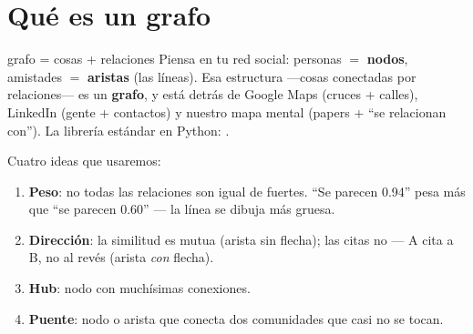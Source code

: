 \documentclass[11pt,a4paper]{article}
\begin{document}

\section{Qué es un grafo}

\begin{concepto}{grafo = cosas + relaciones}
Piensa en tu red social: personas $=$ \textbf{nodos}, amistades $=$ \textbf{aristas} (las
líneas). Esa estructura —cosas conectadas por relaciones— es un \textbf{grafo}, y está detrás
de Google Maps (cruces + calles), LinkedIn (gente + contactos) y nuestro mapa mental
(papers + ``se relacionan con''). La librería estándar en Python: .
\end{concepto}

Cuatro ideas que usaremos:
\begin{enumerate}
  \item \textbf{Peso}: no todas las relaciones son igual de fuertes. ``Se parecen 0.94'' pesa
        más que ``se parecen 0.60'' — la línea se dibuja más gruesa.
  \item \textbf{Dirección}: la similitud es mutua (arista sin flecha); las citas no — A cita
        a B, no al revés (arista \emph{con} flecha).
  \item \textbf{Hub}: nodo con muchísimas conexiones.
  \item \textbf{Puente}: nodo o arista que conecta dos comunidades que casi no se tocan.
\end{enumerate}

\begin{center}
\end{center}
\end{document}
